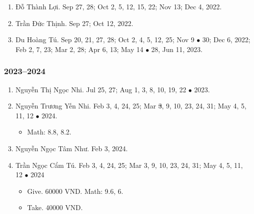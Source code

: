 \documentclass{article}
\begin{document}
\begin{enumerate}
	\item {\sc Đỗ Thành Lợi.} {\sf[In]} Sep 27, 28; Oct 2, 5, 12, 15, 22; Nov 13; Dec 4, 2022. {\sf[Out]}
	\item {\sc Trần Đức Thịnh.} {\sf[In]} Sep 27; Oct 12, 2022. {\sf[Out]}
	\item {\sc Du Hoàng Tú.} {\sf[In]} Sep 20, 21, 27, 28; Oct 2, 4, 5, 12, 25; Nov 9 $\bullet$ 30; Dec 6, 2022; Feb 2, 7, 23; Mar 2, 28; Apr 6, 13; May 14 $\bullet$ 28, Jun 11, 2023. {\sf[Out]}
\end{enumerate}

\subsubsection{2023--2024}

\begin{enumerate}
	\item {\sc Nguyễn Thị Ngọc Nhi.} {\sf[In]} Jul 25, 27; Aug 1, 3, 8, 10, 19, 22 $\bullet$ 2023. {\sf[Out]}
	\item {\sc Nguyễn Trương Yến Nhi.} {\sf[In]} Feb 3, 4, 24, 25; Mar \st{3}, 9, 10, 23, 24, 31; May 4, 5, 11, 12 $\bullet$ 2024.
	\begin{itemize}
		\item Math: 8.8, 8.2.
	\end{itemize}
	\item {\sc Nguyễn Ngọc Tâm Như.} {\sf[In]} Feb 3, 2024. {\sf[Out]}
	\item {\sc Trần Ngọc Cẩm Tú.} {\sf[In]} Feb 3, 4, 24, 25; Mar 3, 9, 10, 23, 24, 31; May 4, 5, 11, 12 $\bullet$ 2024
	\begin{itemize}
		\item {\sf Give.} 60000 VND. Math: 9.6, 6.
		\item {\sf Take.} 40000 VND.
	\end{itemize}
\end{enumerate}


\printbibliography[heading=bibintoc]
	
\end{document}
